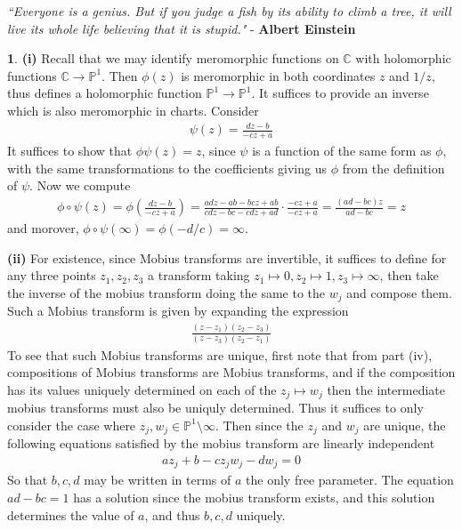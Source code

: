 \documentclass[10.5pt]{article}
\theoremstyle{definition}
\newtheorem{pb}{}
\begin{document}
    \emph{``Everyone is a genius. But if you judge a fish by its ability to climb a tree, it will live its whole life believing that it is stupid."} - \textbf{Albert Einstein}
    \begin{pb}
        \textbf{(i)} Recall that we may identify meromorphic functions on \(\mathbb{C}\) with holomorphic functions \(\mathbb{C} \to \mathbb{P}^1\). Then \(\phi(z)\) is meromorphic in both coordinates \(z\) and \(1/z\), thus defines a holomorphic function \(\mathbb{P}^1 \to \mathbb{P}^1\). It suffices to provide an inverse which is also meromorphic in charts. Consider
        \begin{align*}
            \psi(z) = \frac{dz - b}{-cz + a}
        \end{align*}
        It suffices to show that \(\phi\psi(z) = z\), since \(\psi\) is a function of the same form as \(\phi\), with the same transformations to the coefficients giving us \(\phi\) from the definition of \(\psi\). Now we compute
        \begin{align*}
            \phi\circ\psi(z) = \phi\left(\frac{dz - b}{-cz + a}\right) = \frac{adz-ab -bcz + ab}{cdz - bc - cdz + ad}\cdot\frac{-cz+a}{-cz+a} = \frac{(ad-bc)z}{ad-bc} = z
        \end{align*}
        and morover, \(\phi\circ\psi(\infty) = \phi(-d/c) = \infty\).

        \textbf{(ii)} For existence, since Mobius transforms are invertible, it suffices to define for any three points \(z_1,z_2,z_3\) a transform taking \(z_1 \mapsto 0, z_2 \mapsto 1, z_3 \mapsto \infty\), then take the inverse of the mobius transform doing the same to the \(w_j\) and compose them. Such a Mobius transform is given by expanding the expression
        \begin{align*}
            \frac{(z-z_1)(z_2-z_3)}{(z-z_3)(z_2-z_1)}
        \end{align*}
        To see that such Mobius transforms are unique, first note that from part (iv), compositions of Mobius transforms are Mobius transforms, and if the composition has its values uniquely determined on each of the \(z_j \mapsto w_j\) then the intermediate mobius transforms must also be uniquly determined. Thus it suffices to only consider the case where \(z_j, w_j \in \mathbb{P}^1 \setminus \infty\). Then since the \(z_j\) and \(w_j\) are unique, the following equations satisfied by the mobius transform are linearly independent
        \begin{align*}
            az_j + b - cz_jw_j - dw_j = 0
        \end{align*}
        So that \(b,c,d\) may be written in terms of \(a\) the only free parameter. The equation \(ad-bc = 1\) has a solution since the mobius transform exists, and this solution determines the value of \(a\), and thus \(b,c,d\) uniquely.


\end{pb}
\end{document}
